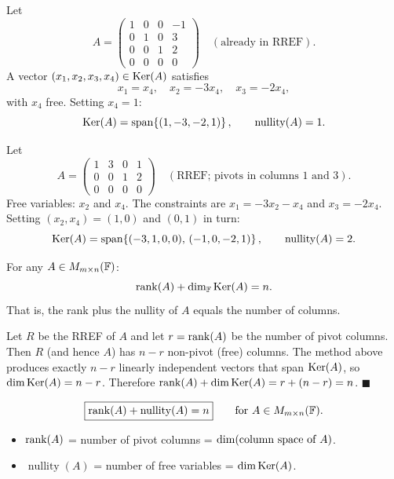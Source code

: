 \begin{exbox}
Let
\[
    A = \begin{pmatrix}
        1 & 0 & 0 & -1 \\
        0 & 1 & 0 &  3 \\
        0 & 0 & 1 &  2 \\
        0 & 0 & 0 &  0
    \end{pmatrix}
    \quad(\text{already in RREF}).
\]
A vector $(x_1,x_2,x_3,x_4)\in\operatorname{Ker}(A)$ satisfies
\[
    x_1 = x_4,\quad x_2 = -3x_4,\quad x_3 = -2x_4,
\]
with $x_4$ free.  Setting $x_4=1$:
\[
    \operatorname{Ker}(A) = \operatorname{span}\!\left\{(1,-3,-2,1)\right\},
    \qquad \operatorname{nullity}(A)=1.
\]
\end{exbox}

\begin{exbox}
Let
\[
    A = \begin{pmatrix}
        1 & 3 & 0 & 1 \\
        0 & 0 & 1 & 2 \\
        0 & 0 & 0 & 0
    \end{pmatrix}
    \quad(\text{RREF; pivots in columns 1 and 3}).
\]
Free variables: $x_2$ and $x_4$.  The constraints are
$x_1 = -3x_2 - x_4$ and $x_3 = -2x_4$.  Setting $(x_2,x_4)=(1,0)$ and
$(0,1)$ in turn:
\[
    \operatorname{Ker}(A) = \operatorname{span}\!\left\{(-3,1,0,0),\,(-1,0,-2,1)\right\},
    \qquad \operatorname{nullity}(A)=2.
\]
\end{exbox}

\begin{thmbox}
\label{thm:rank-nullity-matrix}
For any $A\in M_{m\times n}(\mathbb{F})$:
\[
    \operatorname{rank}(A) + \operatorname{dim}_{\mathbb{F}}\operatorname{Ker}(A) = n.
\]
That is, the rank plus the nullity of $A$ equals the number of columns.
\end{thmbox}

\begin{proofbox}
Let $R$ be the RREF of $A$ and let $r=\operatorname{rank}(A)$ be the number of pivot columns.
Then $R$ (and hence $A$) has $n-r$ non-pivot (free) columns.  The method above
produces exactly $n-r$ linearly independent vectors that span $\operatorname{Ker}(A)$, so
$\operatorname{dim}\operatorname{Ker}(A)=n-r$.  Therefore $\operatorname{rank}(A)+\operatorname{dim}\operatorname{Ker}(A)=r+(n-r)=n$.
\hfill$\blacksquare$
\end{proofbox}

\begin{flowbox}
\[
    \boxed{\operatorname{rank}(A) + \operatorname{nullity}(A) = n}
    \qquad \text{for } A\in M_{m\times n}(\mathbb{F}).
\]
\begin{itemize}
    \item $\operatorname{rank}(A)$ = number of pivot columns = $\operatorname{dim}(\text{column space of }A)$.
    \item $\operatorname{nullity}(A)$ = number of free variables
          = $\operatorname{dim}\operatorname{Ker}(A)$.
\end{itemize}
\end{flowbox}
